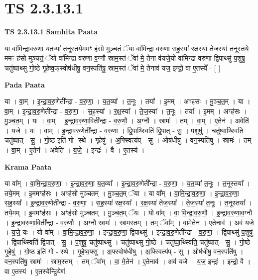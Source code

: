 \documentclass[17pt]{extarticle}
\begin{document}
\section{ TS 2.3.13.1 }

\textbf{TS 2.3.13.1 } \newline
\textbf{Samhita Paata} \newline

या वा॑मिन्द्रावरुणा यत॒व्या॑ त॒नूस्तये॒ममꣳ ह॑सो मुञ्चतं॒ ॅया वा॑मिन्द्रा वरुणा सह॒स्या॑ रक्ष॒स्या॑ तेज॒स्या॑ त॒नूस्तये॒ ममꣳ ह॑सो मुञ्चतं॒ ॅयो वा॑मिन्द्रा वरुणा व॒ग्नौ स्राम॒स्तं ॅवा॑ मे॒ तेना व॑यजे॒यो वा॑मिन्द्रा वरुणा द्वि॒पाथ्सु॑ प॒शुषु॒ चतु॑ष्पाथ्सु गो॒ष्ठे गृ॒हेष्व॒फ्‌स्वोष॑धीषु॒ वन॒स्पति॑षु॒ स्राम॒स्तं ॅवा॑ मे॒ तेनाव॑ यज॒ इन्द्रो॒ वा ए॒तस्ये᳚ - [  ] \newline

\textbf{Pada Paata} \newline

या । वा॒म् । इ॒न्द्रा॒व॒रु॒णेती᳚न्द्रा - व॒रु॒णा॒ । य॒त॒व्या᳚ । त॒नूः । तया᳚ । इ॒मम् । अꣳह॑सः । मु॒ञ्च॒त॒म् । या । वा॒म् । इ॒न्द्रा॒व॒रु॒णेती᳚न्द्रा - व॒रु॒णा॒ । स॒ह॒स्या᳚ । र॒क्ष॒स्या᳚ । ते॒ज॒स्या᳚ । त॒नूः । तया᳚ । इ॒मम् । अꣳह॑सः । मु॒ञ्च॒त॒म् ।  यः । वा॒म् । इ॒न्द्रा॒व॒रु॒णा॒विती᳚न्द्रा - व॒रु॒णौ॒ । अ॒ग्नौ । स्रामः॑ । तम् । वा॒म् । ए॒तेन॑ । अवेति॑ । य॒जे॒ । यः । वा॒म् । इ॒न्द्रा॒व॒रु॒णेती᳚न्द्रा - व॒रु॒णा॒ । द्वि॒पाथ्स्विति॑ द्वि॒पात् - सु॒ । प॒शुषु॑ । चतु॑ष्पा॒थ्स्विति॒ चतु॑ष्पात् - सु॒ । गो॒ष्ठ इति॑ गो- स्थे । गृ॒हेषु॑ । अ॒फ्स्वित्य॑प् - सु । ओष॑धीषु । वन॒स्पति॑षु । स्रामः॑ । तम् । वा॒म् । ए॒तेन॑ । अवेति॑ । य॒जे॒ । इन्द्रः॑ । वै । ए॒तस्य॑ ।  \newline


\textbf{Krama Paata} \newline

या वा᳚म् । वा॒मि॒न्द्रा॒व॒रु॒णा॒ । इ॒न्द्रा॒व॒रु॒णा॒ य॒त॒व्या᳚ । इ॒न्द्रा॒व॒रु॒णेती᳚न्द्रा - व॒रु॒णा॒ । य॒त॒व्या॑ त॒नूः । त॒नूस्तया᳚ । तये॒मम् । इ॒ममꣳह॑सः । अꣳह॑सो मुञ्चतम् । मु॒ञ्च॒त॒म् ॅया । या वा᳚म् । वा॒मि॒न्द्रा॒व॒रु॒णा॒ । इ॒न्द्रा॒व॒रु॒णा॒ स॒ह॒स्या᳚ । इ॒न्द्रा॒व॒रु॒णेती᳚न्द्रा - व॒रु॒णा॒ । स॒ह॒स्या॑ रक्ष॒स्या᳚ । र॒क्ष॒स्या॑ तेज॒स्या᳚ । ते॒ज॒स्या॑ त॒नूः । त॒नूस्तया᳚ । तये॒मम् । इ॒ममꣳह॑सः । अꣳह॑सो मुञ्चतम् । मु॒ञ्च॒त॒म् ॅयः । यो वा᳚म् । वा॒ मि॒न्द्रा॒व॒रु॒णौ॒ । इ॒न्द्रा॒व॒रु॒णा॒व॒ग्नौ । इ॒न्द्रा॒व॒रु॒णा॒विती᳚न्द्रा - व॒रु॒णौ॒ । अ॒ग्नौ स्रामः॑ । स्राम॒स्तम् । तम् ॅवा᳚म् । वा॒मे॒तेन॑ । ए॒तेनाव॑ । अव॑ यजे । य॒जे॒ यः । यो वा᳚म् । वा॒मि॒न्द्रा॒व॒रु॒णा॒ । इ॒न्द्रा॒व॒रु॒णा॒ द्वि॒पाथ्सु॑ । इ॒न्द्रा॒व॒रु॒णेती᳚न्द्रा - व॒रु॒णा॒ । द्वि॒पाथ्सु॑ प॒शुषु॑ । द्वि॒पाथ्स्विति॑ द्वि॒पात् - सु॒ । प॒शुषु॒ चतु॑ष्पाथ्सु । चतु॑ष्पाथ्सु गो॒ष्ठे । चतु॑ष्पा॒थ्स्विति॒ चतु॑ष्पात् - सु॒ । गो॒ष्ठे गृ॒हेषु॑ । गो॒ष्ठ इति॑ गो - स्थे । गृ॒हेष्व॒फ्सु । अ॒फ्स्वोष॑धीषु । अ॒फ्स्वित्य॑प् - सु । ओष॑धीषु॒ वन॒स्पति॑षु । वन॒स्पति॑षु॒ स्रामः॑ । स्राम॒स्तम् । तम् ॅवा᳚म् । वा॒ मे॒तेन॑ । ए॒तेनाव॑ । अव॑ यजे । य॒ज॒ इन्द्रः॑ । इन्द्रो॒ वै । वा ए॒तस्य॑ । ए॒तस्ये᳚न्द्रि॒येण॑ \newline
\end{document}
